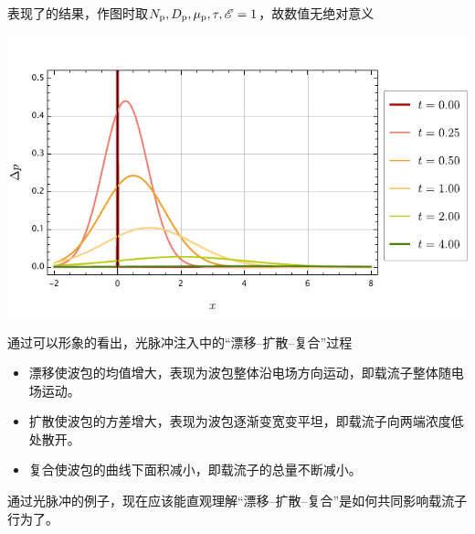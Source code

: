表现了的结果，作图时取$N_\text{p},D_\text{p},\mu_\text{p},\tau,\mathscr{E}=1$，故数值无绝对意义\vspace{-4ex}
\begin{Figure}[非平衡载流子的光脉冲注入]
    \includegraphics[scale=0.95]{Mathematica/output/DeltPExp.pdf}
\end{Figure}
通过可以形象的看出，光脉冲注入中的“漂移--扩散--复合”过程
\begin{itemize}
    \item 漂移使波包的均值增大，表现为波包整体沿电场方向运动，即载流子整体随电场运动。
    \item 扩散使波包的方差增大，表现为波包逐渐变宽变平坦，即载流子向两端浓度低处散开。
    \item 复合使波包的曲线下面积减小，即载流子的总量不断减小。
\end{itemize}

通过光脉冲的例子，现在应该能直观理解“漂移--扩散--复合”是如何共同影响载流子行为了。

